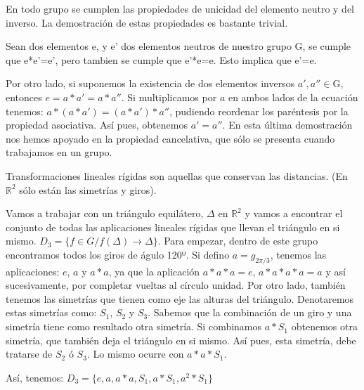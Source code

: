 \documentclass[a4paper,10pt]{apuntes}
\newenvironment{example}[1][Ejemplo]{\begin{trivlist}
\item[\hskip \labelsep {\bfseries #1}]}{\end{trivlist}}
\begin{document}
 En todo grupo se cumplen las propiedades de unicidad del elemento neutro y del inverso. La demostración de estas propiedades
 es bastante trivial.
 
 Sean dos elementos e, y e' dos elementos neutros de nuestro grupo G, se cumple que e*e'=e', pero tambien se cumple que e'*e=e. Esto 
 implica que e'=e.

 Por otro lado, si suponemos la existencia de dos elementos inversos $a',a''\in$G, entonces $e=a*a'=a*a''$. Si multiplicamos por $a$ en ambos lados de la ecuación tenemos: $a*(a*a')=(a*a')*a''$, pudiendo reordenar los paréntesis por la 
 propiedad asociativa. Así pues, obtenemos $a'=a''$.
 En esta última demostración nos hemos apoyado en la propiedad cancelativa, que sólo se presenta cuando trabajamos en un grupo.
  
 \begin{defn}
  Transformaciones lineales rígidas son aquellas que conservan las distancias. (En $\mathds{R}^{2}$  sólo están las simetrías y giros).\\
 \end{defn}
 
 \begin{example} 
  Vamos a trabajar con un triángulo equilátero, $\Delta$  en $\mathds{R}^{2}$  y vamos a encontrar el conjunto de todas las aplicaciones lineales rígidas 
  que llevan el triángulo en si mismo. $D_{3}=\{f\in G / f(\Delta)\longrightarrow\Delta\}$.
  Para empezar, dentro de este grupo encontramos todos los giros de águlo 120º. Si defino $a=g_{2\pi/3}$, tenemos las aplicaciones:
  $e$, $a$  y $a*a$, ya que la aplicación $a*a*a=e$, $a*a*a*a=a$  y así sucesivamente, por completar vueltas al círculo unidad.
  Por otro lado, también tenemos las simetrías que tienen como eje las alturas del triángulo. Denotaremos estas simetrías como: $S_{1}$, $S_{2}$  y $S_{3}$.
  Sabemos que la combinación de un giro y una simetría tiene como resultado otra simetría. Si combinamos $a*S_{1}$  obtenemos otra simetría, 
  que también deja el triángulo en si mismo. Así pues, esta simetría, debe tratarse de $S_{2}$  ó $S_{3}$. Lo mismo ocurre con $a*a*S_{1}$.
  
  Así, tenemos: $D_{3}=\{e, a, a*a, S_{1}, a*S_{1}, a^{2}*S_{1}\}$
 \end{example}
\end{document}

